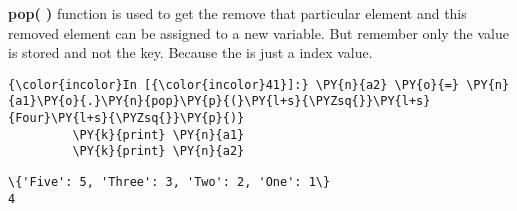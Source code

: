     \textbf{pop( )} function is used to get the remove that particular
element and this removed element can be assigned to a new variable. But
remember only the value is stored and not the key. Because the is just a
index value.

    \begin{Verbatim}[commandchars=\\\{\}]
{\color{incolor}In [{\color{incolor}41}]:} \PY{n}{a2} \PY{o}{=} \PY{n}{a1}\PY{o}{.}\PY{n}{pop}\PY{p}{(}\PY{l+s}{\PYZsq{}}\PY{l+s}{Four}\PY{l+s}{\PYZsq{}}\PY{p}{)}
         \PY{k}{print} \PY{n}{a1}
         \PY{k}{print} \PY{n}{a2}
\end{Verbatim}

    \begin{Verbatim}[commandchars=\\\{\}]
\{'Five': 5, 'Three': 3, 'Two': 2, 'One': 1\}
4
    \end{Verbatim}


    
  \newpage
  
    
    
    
